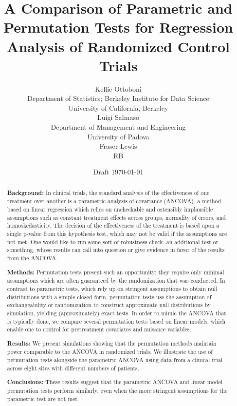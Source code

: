 \documentclass[11pt]{article}
\title{A Comparison of Parametric and Permutation Tests for Regression Analysis of Randomized Control Trials}
\author{Kellie Ottoboni \\
Department of Statistics; Berkeley Institute for Data Science\\
University of California, Berkeley\\ [.2in]
Luigi Salmaso\\
Department of Management and Engineering \\
University of Padova \\ [.2in]
Fraser Lewis \\
RB
}\date{Draft \today}
\begin{document}
\maketitle

\newpage

\begin{abstract}
\noindent\textbf{Background:}
In clinical trials, the standard analysis of the effectiveness of one treatment over another is a parametric analysis of covariance (ANCOVA), a method based on linear regression which relies on uncheckable and ostensibly implausible assumptions such as constant treatment effects across groups, normality of errors, and homoskedasticity.
The decision of the effectiveness of the treatment is based upon a single p-value from this hypothesis test, which may not be valid if the assumptions are not met.
One would like to run some sort of robustness check, an additional test or something, whose results can call into question or give evidence in favor of the results from the ANCOVA.

\noindent\textbf{Methods:}
Permutation tests present such an opportunity: they require only minimal assumptions which are often guaranteed by the randomization that was conducted.
In contrast to parametric tests, which rely up on stringent assumptions to obtain null distributions with a simple closed form, permutation tests use the assumption of exchangeability or randomization to construct approximate null distributions by simulation, yielding (approximately) exact tests.
In order to mimic the ANCOVA that is typically done, we compare several permutation tests based on linear models, which enable one to control for pretreatment covariates and nuisance variables.

\noindent\textbf{Results:}
We present simulations showing that the permutation methods maintain power comparable to the ANCOVA in randomized trials.
We illustrate the use of permutation tests alongside the parametric ANCOVA using data from a clinical trial across eight sites with different numbers of patients.

\noindent\textbf{Conclusions:}
These results suggest that the parametric ANCOVA and linear model permutation tests perform similarly, even when the more stringent assumptions for the parametric test are not met.


\end{abstract}

\newpage
\end{document}
